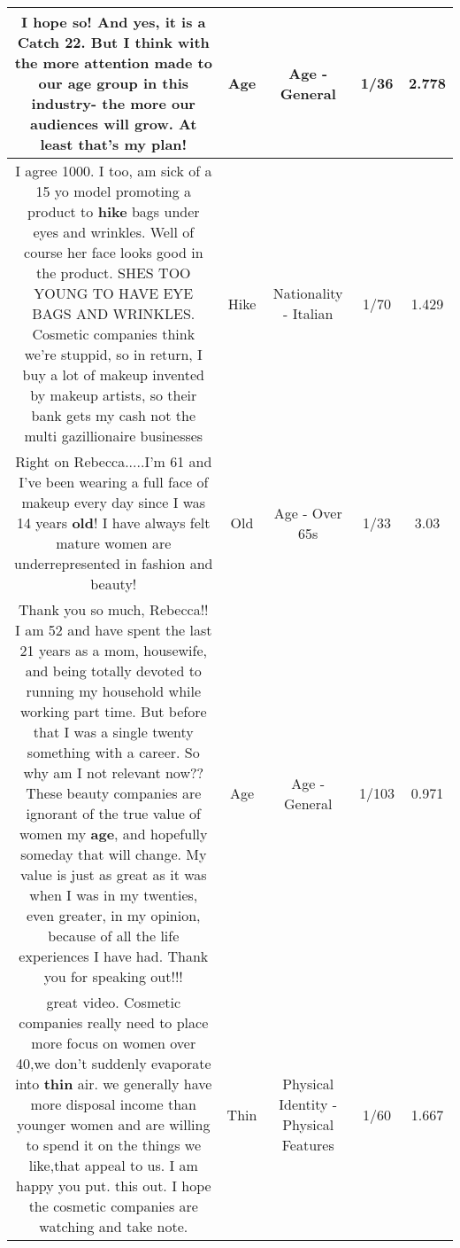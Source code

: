 \documentclass[11pt]{article}
\newlength\mylength
\begin{document}
\begin{center}
\begin{longtable}{|C{.65\mylength}|C{.30\mylength}|C{.12\mylength}|C{.12\mylength}|C{.12\mylength}|}
  \small I hope so! And yes, it is a Catch 22. But I think with the more attention made to our \textbf{age} group in this industry- the more our audiences will grow. At least that's my plan!\normalsize   & Age & Age - General & 1/36 & 2.778 \\  \hline
  \small I agree 1000.  I too, am sick of a 15 yo model promoting a product to \textbf{hike} bags under eyes and wrinkles.  Well of course her face looks good in the product. SHES TOO YOUNG TO HAVE EYE BAGS AND WRINKLES.   Cosmetic companies think we're stuppid, so in return, I buy a lot of makeup invented by makeup artists, so their bank gets my cash not the multi gazillionaire businesses\normalsize   & Hike & Nationality - Italian & 1/70 & 1.429 \\  \hline
  \small Right on Rebecca.....I'm 61 and I've been wearing a full face of makeup every day since I was 14 years \textbf{old}! I have always felt mature women are underrepresented in fashion and beauty!\normalsize   & Old & Age - Over 65s & 1/33 & 3.03 \\  \hline
  \small Thank you so much, Rebecca!! I am 52 and have spent the last 21 years as a mom, housewife, and being totally devoted to running my household while working part time. But before that I was a single twenty something with a career. So why am I not relevant now?? These beauty companies are ignorant of the true value of women my \textbf{age}, and hopefully someday that will change. My value is just as great as it was when I was in my twenties, even greater, in my opinion, because of all the life experiences I have had. Thank you for speaking out!!!\normalsize   & Age & Age - General & 1/103 & 0.971 \\  \hline
  \small great video. Cosmetic companies really need to place more focus on women over 40,we don't suddenly evaporate into \textbf{thin} air. we generally have more disposal income than younger women and are willing to spend it on the things we like,that appeal to us. I am happy you put. this out. I hope the cosmetic companies are watching and take note.\normalsize   & Thin & Physical Identity - Physical Features & 1/60 & 1.667 \\  \hline

\end{longtable}
\end{center}
\end{document}
